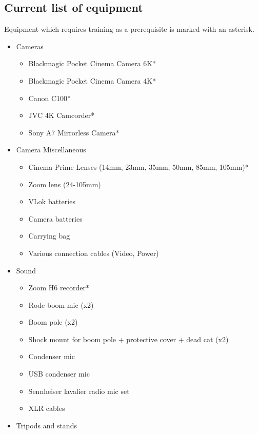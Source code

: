 \documentclass[]{article}
\begin{document}
\subsection{Current list of equipment}
Equipment which requires training as a prerequisite is marked with an asterisk.
\begin{itemize}
    \item Cameras
          \begin{itemize}
              \item Blackmagic Pocket Cinema Camera 6K*
              \item Blackmagic Pocket Cinema Camera 4K*
              \item Canon C100*
              \item JVC 4K Camcorder*
              \item Sony A7 Mirrorless Camera*
          \end{itemize}
    \item Camera Miscellaneous
          \begin{itemize}
              \item Cinema Prime Lenses (14mm, 23mm, 35mm, 50mm, 85mm, 105mm)*
              \item Zoom lens (24-105mm)
              \item VLok batteries
              \item Camera batteries
              \item Carrying bag
              \item Various connection cables (Video, Power)
          \end{itemize}
    \item Sound
          \begin{itemize}
              \item Zoom H6 recorder*
              \item Rode boom mic (x2)
              \item Boom pole (x2)
              \item Shock mount for boom pole + protective cover + dead cat (x2)
              \item Condenser mic
              \item USB condenser mic
              \item Sennheiser lavalier radio mic set
              \item XLR cables
          \end{itemize}
    \item Tripods and stands

\end{itemize}
\end{document}
